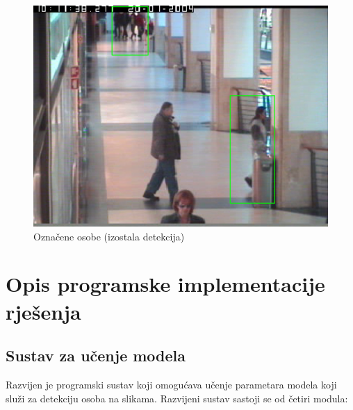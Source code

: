 \documentclass[times, utf8, seminar, numeric]{fer}
\begin{document}
\begin{figure}
\centering
\includegraphics[width=1\textwidth]{otok_detekt.png}
\caption{Označene osobe (izostala detekcija)}
\label{otok_detekt}
\end{figure}


\chapter{Opis programske implementacije rješenja}

\section{Sustav za učenje modela}

Razvijen je programski sustav koji omogućava učenje parametara modela koji služi za detekciju osoba na slikama. Razvijeni sustav sastoji se od četiri modula:
\end{document}
